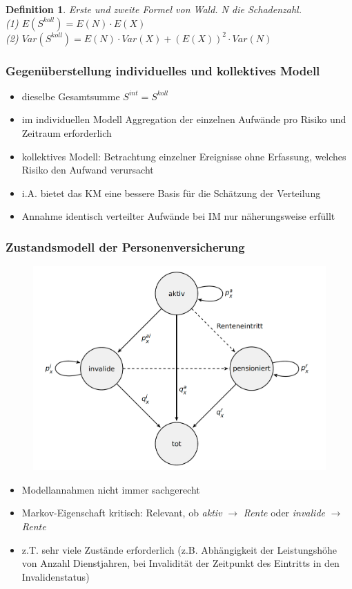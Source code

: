 \documentclass[12pt]{report}
\theoremstyle{dotless}
\newtheorem{defn}[thm]{Definition}
\theoremstyle{definition}
\begin{document}
\begin{defn}
	Erste und zweite Formel von Wald. N die Schadenzahl. \\
	(1) $E(S^{koll})=E(N)\cdot E(X)$ \\
	(2) $Var(S^{koll})=E(N) \cdot Var(X) + (E(X))^2 \cdot Var(N)$
\end{defn}

\subsubsection{Gegenüberstellung individuelles und kollektives Modell}
\begin{itemize}
	\item dieselbe Gesamtsumme $S^{int}=S^{koll}$
	\item im individuellen Modell Aggregation der einzelnen Aufwände pro Risiko und Zeitraum erforderlich
	\item kollektives Modell: Betrachtung einzelner Ereignisse ohne Erfassung, welches Risiko den Aufwand verursacht
	\item i.A. bietet das KM eine bessere Basis für die Schätzung der Verteilung
	\item Annahme identisch verteilter Aufwände bei IM nur näherungsweise erfüllt 
\end{itemize}


\subsubsection{Zustandsmodell der Personenversicherung}

\begin{figure}[ht]
	\centering
	\includegraphics[width = .8\textwidth]{Bilder/ZustandsmodellPersVers}
\end{figure}
 \begin{itemize}
 	\item Modellannahmen nicht immer sachgerecht
 	\item Markov-Eigenschaft kritisch: Relevant, ob \textit{aktiv} $\rightarrow$ \textit{Rente} oder \textit{invalide} $\rightarrow$ \textit{Rente}
 	\item z.T. sehr viele Zustände erforderlich (z.B. Abhängigkeit der Leistungshöhe von Anzahl Dienstjahren, bei Invalidität der Zeitpunkt des Eintritts in den Invalidenstatus)
 \end{itemize}
\end{document}
